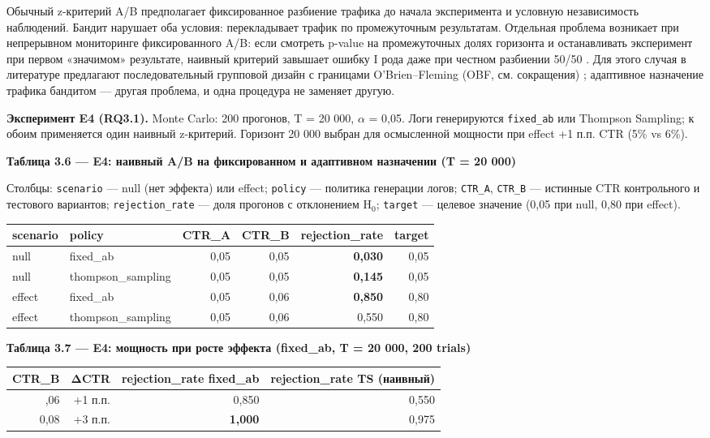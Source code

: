 Обычный z-критерий A/B предполагает фиксированное разбиение трафика до начала эксперимента и условную независимость наблюдений. Бандит нарушает оба условия: перекладывает трафик по промежуточным результатам. Отдельная проблема возникает при непрерывном мониторинге фиксированного A/B: если смотреть p-value на промежуточных долях горизонта и останавливать эксперимент при первом «значимом» результате, наивный критерий завышает ошибку I рода даже при честном разбиении 50/50 \cite{ref19}. Для этого случая в литературе предлагают последовательный групповой дизайн с границами O'Brien--Fleming (OBF, см. сокращения) \cite{ref19}; адаптивное назначение трафика бандитом --- другая проблема, и одна процедура не заменяет другую.

\textbf{Эксперимент E4 (RQ3.1).} Monte Carlo: 200 прогонов, T = 20 000, $\alpha$ = 0,05. Логи генерируются \texttt{fixed\_ab} или Thompson Sampling; к обоим применяется один наивный z-критерий. Горизонт 20 000 выбран для осмысленной мощности при effect +1 п.п. CTR (5\% vs 6\%).

\textbf{Таблица 3.6 --- E4: наивный A/B на фиксированном и адаптивном назначении (T = 20 000)}

Столбцы: \texttt{scenario} --- null (нет эффекта) или effect; \texttt{policy} --- политика генерации логов; \texttt{CTR\_A}, \texttt{CTR\_B} --- истинные CTR контрольного и тестового вариантов; \texttt{rejection\_rate} --- доля прогонов с отклонением H$_0$; \texttt{target} --- целевое значение (0,05 при null, 0,80 при effect).

\begingroup\footnotesize\setlength{\tabcolsep}{4pt}
\begin{xltabular}{\linewidth}{@{}llrrrr@{}}
\toprule\noalign{}
scenario & policy & CTR\_A & CTR\_B & rejection\_rate & target \\
\midrule\noalign{}
\endhead
\bottomrule\noalign{}
\endlastfoot
null & fixed\_ab & 0,05 & 0,05 & \textbf{0,030} & 0,05 \\
null & thompson\_sampling & 0,05 & 0,05 & \textbf{0,145} & 0,05 \\
effect & fixed\_ab & 0,05 & 0,06 & \textbf{0,850} & 0,80 \\
effect & thompson\_sampling & 0,05 & 0,06 & 0,550 & 0,80 \\
\end{xltabular}
\endgroup

\textbf{Таблица 3.7 --- E4: мощность при росте эффекта (fixed\_ab, T = 20 000, 200 trials)}

\begingroup\footnotesize\setlength{\tabcolsep}{4pt}
\begin{xltabular}{\linewidth}{@{}rrrr@{}}
\toprule\noalign{}
CTR\_B & ΔCTR & rejection\_rate fixed\_ab & rejection\_rate TS (наивный) \\
\midrule\noalign{}
\endhead
\bottomrule\noalign{}
,06 & +1 п.п. & 0,850 & 0,550 \\
0,08 & +3 п.п. & \textbf{1,000} & 0,975 \\
\end{xltabular}
\endgroup


